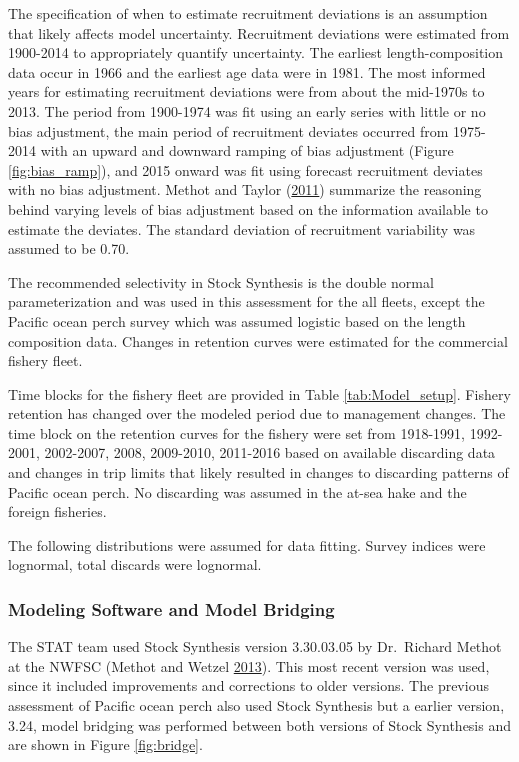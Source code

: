 \documentclass[12pt,]{article}
\begin{document}
The specification of when to estimate recruitment deviations is an
assumption that likely affects model uncertainty. Recruitment deviations
were estimated from 1900-2014 to appropriately quantify uncertainty. The
earliest length-composition data occur in 1966 and the earliest age data
were in 1981. The most informed years for estimating recruitment
deviations were from about the mid-1970s to 2013. The period from
1900-1974 was fit using an early series with little or no bias
adjustment, the main period of recruitment deviates occurred from
1975-2014 with an upward and downward ramping of bias adjustment (Figure
\ref{fig:bias_ramp}), and 2015 onward was fit using forecast recruitment
deviates with no bias adjustment. Methot and Taylor
(\protect\hyperlink{ref-methot_adjusting_2011}{2011}) summarize the
reasoning behind varying levels of bias adjustment based on the
information available to estimate the deviates. The standard deviation
of recruitment variability was assumed to be 0.70.

The recommended selectivity in Stock Synthesis is the double normal
parameterization and was used in this assessment for the all fleets,
except the Pacific ocean perch survey which was assumed logistic based
on the length composition data. Changes in retention curves were
estimated for the commercial fishery fleet.

Time blocks for the fishery fleet are provided in Table
\ref{tab:Model_setup}. Fishery retention has changed over the modeled
period due to management changes. The time block on the retention curves
for the fishery were set from 1918-1991, 1992-2001, 2002-2007, 2008,
2009-2010, 2011-2016 based on available discarding data and changes in
trip limits that likely resulted in changes to discarding patterns of
Pacific ocean perch. No discarding was assumed in the at-sea hake and
the foreign fisheries.

The following distributions were assumed for data fitting. Survey
indices were lognormal, total discards were lognormal.

\subsubsection{Modeling Software and Model
Bridging}\label{modeling-software-and-model-bridging}

The STAT team used Stock Synthesis version 3.30.03.05 by Dr.~Richard
Methot at the NWFSC (Methot and Wetzel
\protect\hyperlink{ref-methot_stock_2013}{2013}). This most recent
version was used, since it included improvements and corrections to
older versions. The previous assessment of Pacific ocean perch also used
Stock Synthesis but a earlier version, 3.24, model bridging was
performed between both versions of Stock Synthesis and are shown in
Figure \ref{fig:bridge}.
\end{document}
